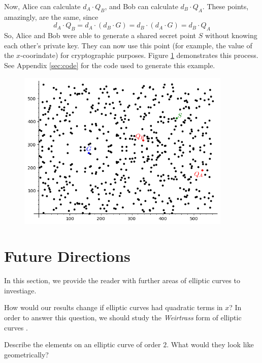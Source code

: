 \documentclass[]{math_paper}
\begin{document}
Now, Alice can calculate $d_A \cdot Q_B$, and Bob can calculate $d_B \cdot Q_A$. These points, amazingly, are the same, since $$d_A \cdot Q_B = d_A \cdot (d_B \cdot G) = d_B \cdot (d_A \cdot G) = d_B \cdot Q_A$$
So, Alice and Bob were able to generate a shared secret point $S$ without knowing each other's private key. They can now use this point (for example, the value of the $x$-coorindate) for cryptographic purposes. Figure \ref{fig:crypto} demonstrates this process. See Appendix \ref{sec:code} for the code used to generate this example.

\begin{figure}[h]
    \centering
    \includegraphics[height= 3in]{media/crypto.png}
    \label{fig:crypto}
\end{figure}
\section{Future Directions} \label{sec:future}
In this section, we provide the reader with further areas of elliptic curves to investiage.

\begin{question}
    How would our results change if elliptic curves had quadratic terms in $x$? In order to answer this question, we should study the \emph{Weirtrass} form of elliptic curves \cite{cassels_1991}.
\end{question}
\begin{question}
    Describe the elements on an elliptic curve of order $2$. What would they look like geometrically?
\end{question}


\appendix
\end{document}
